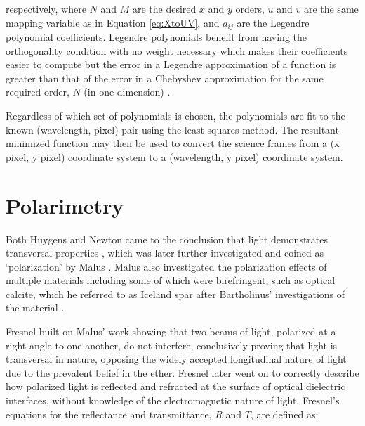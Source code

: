 \noindent respectively, where $N$ and $M$ are the desired $x$ and $y$ orders, $u$ and $v$ are the same mapping variable as in Equation \ref{eq:XtoUV}, and $a_{ij}$ are the Legendre polynomial coefficients. Legendre polynomials benefit from having the orthogonality condition with no weight necessary which makes their coefficients easier to compute but the error in a Legendre approximation of a function is greater than that of the error in a Chebyshev approximation for the same required order, $N$ (in one dimension) \citep{leg_cheb_relation}.
\prgph

Regardless of which set of polynomials is chosen, the polynomials are fit to the known (wavelength, pixel) pair using the least squares method. The resultant minimized function may then be used to convert the science frames from a (x pixel, y pixel) coordinate system to a (wavelength, y pixel) coordinate system.
\prgph


\section{Polarimetry}

Both Huygens and Newton came to the conclusion that light demonstrates transversal properties \citep{Huygens, opticks}, which was later further investigated and coined as `polarization' by Malus \citep{Pol_Malus}. Malus also investigated the polarization effects of multiple materials including some of which were birefringent, such as optical calcite, which he referred to as Iceland spar after Bartholinus' investigations of the material \citep{Bartholinus}.

\prgph

Fresnel built on Malus' work showing that two beams of light, polarized at a right angle to one another, do not interfere, conclusively proving that light is transversal in nature, opposing the widely accepted longitudinal nature of light due to the prevalent belief in the ether. Fresnel later went on to correctly describe how polarized light is reflected and refracted at the surface of optical dielectric interfaces, without knowledge of the electromagnetic nature of light. Fresnel's equations for the reflectance and transmittance, $R$ and $T$, are defined as:

